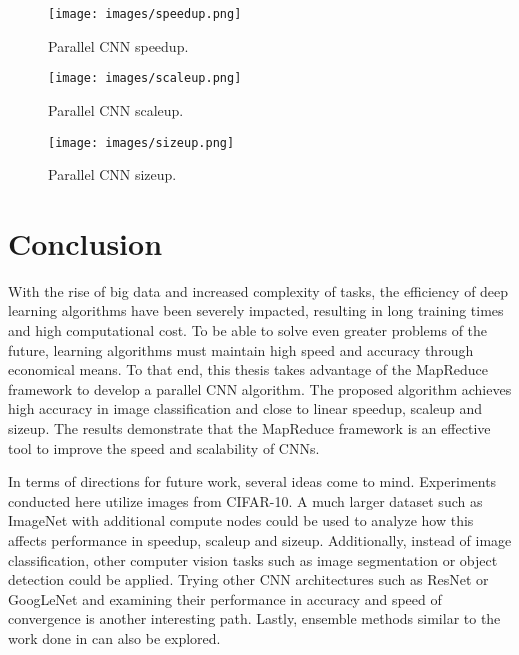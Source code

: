 \documentclass[12pt]{report}
\begin{document}
\begin{figure}[]
\centering
\vspace*{-1.0in}
\texttt{[image: images/speedup.png]}
\caption{Parallel CNN speedup.}
\end{figure}


\begin{figure}[]
\centering
\texttt{[image: images/scaleup.png]}
\caption{Parallel CNN scaleup.}
\end{figure}
 
\begin{figure}[]
\centering
\texttt{[image: images/sizeup.png]}
\caption{Parallel CNN sizeup.}
\end{figure}

\chapter{Conclusion}
With the rise of big data and increased complexity of tasks, the efficiency of deep learning algorithms have been severely impacted, resulting in long training times and high computational cost.  To be able to solve even greater problems of the future, learning algorithms must maintain high speed and accuracy through economical means. To that end, this thesis takes advantage of the MapReduce framework to develop a parallel CNN algorithm.  The proposed algorithm achieves high accuracy in image classification and close to linear speedup, scaleup and sizeup.  The results demonstrate that the MapReduce framework is an effective tool to improve the speed and scalability of CNNs.

In terms of directions for future work, several ideas come to mind. Experiments conducted here utilize images from CIFAR-10. A much larger dataset such as ImageNet with additional compute nodes could be used to analyze how this affects performance in speedup, scaleup and sizeup. Additionally, instead of image classification, other computer vision tasks such as image segmentation or object detection could be applied.  Trying other CNN architectures such as ResNet or GoogLeNet \cite{googleNet} and examining their performance in accuracy and speed of convergence is another interesting path. Lastly, ensemble methods similar to the work done in \cite{MRNN1} can also be explored.

 
\end{document}
